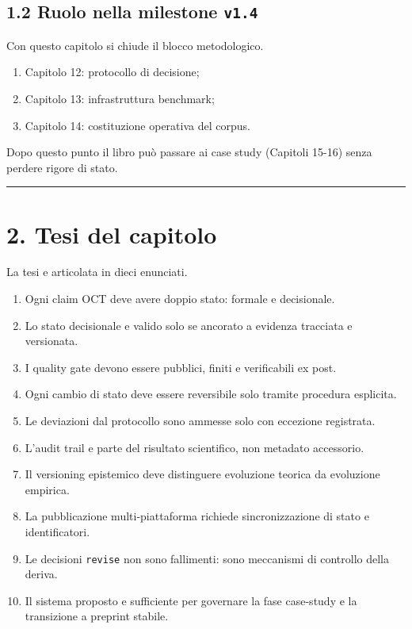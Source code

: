 \subsection{\texorpdfstring{1.2 Ruolo nella milestone \texttt{v1.4}}{1.2 Ruolo nella milestone v1.4}}

Con questo capitolo si chiude il blocco metodologico.

\begin{enumerate}
\def\labelenumi{\arabic{enumi}.}
\tightlist
\item
  Capitolo 12: protocollo di decisione;
\item
  Capitolo 13: infrastruttura benchmark;
\item
  Capitolo 14: costituzione operativa del corpus.
\end{enumerate}

Dopo questo punto il libro può passare ai case study (Capitoli 15-16) senza perdere rigore di stato.

\begin{center}\rule{0.5\linewidth}{0.5pt}\end{center}

\section{2. Tesi del capitolo}

La tesi e articolata in dieci enunciati.

\begin{enumerate}
\def\labelenumi{\arabic{enumi}.}
\tightlist
\item
  Ogni claim OCT deve avere doppio stato: formale e decisionale.
\item
  Lo stato decisionale e valido solo se ancorato a evidenza tracciata e versionata.
\item
  I quality gate devono essere pubblici, finiti e verificabili ex post.
\item
  Ogni cambio di stato deve essere reversibile solo tramite procedura esplicita.
\item
  Le deviazioni dal protocollo sono ammesse solo con eccezione registrata.
\item
  L'audit trail e parte del risultato scientifico, non metadato accessorio.
\item
  Il versioning epistemico deve distinguere evoluzione teorica da evoluzione empirica.
\item
  La pubblicazione multi-piattaforma richiede sincronizzazione di stato e identificatori.
\item
  Le decisioni \texttt{revise} non sono fallimenti: sono meccanismi di controllo della deriva.
\item
  Il sistema proposto e sufficiente per governare la fase case-study e la transizione a preprint stabile.
\end{enumerate}

